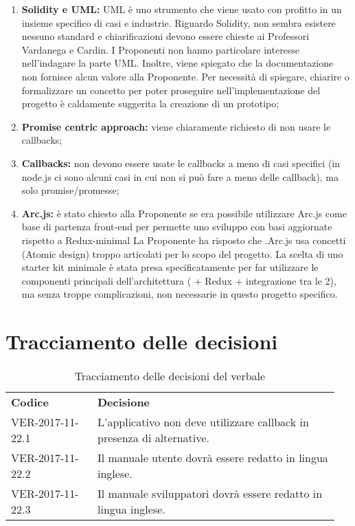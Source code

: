 \documentclass[VER-2017-11-22.tex]{subfiles}
\begin{document}
\begin{enumerate}
	\item \textbf{Solidity e UML:} UML è uno strumento che viene usato con profitto in un insieme specifico di casi e industrie. Riguardo Solidity, non sembra esistere nessuno standard e chiarificazioni devono essere chieste ai Professori Vardanega e Cardin. I Proponenti non hanno particolare interesse nell'indagare la parte UML. Inoltre, viene spiegato che la documentazione non fornisce alcun valore alla Proponente. Per necessità di spiegare, chiarire o formalizzare un concetto per poter proseguire nell'implementazione del progetto è caldamente suggerita la creazione di un prototipo;
	
	\item \textbf{Promise centric approach:} viene chiaramente richiesto di non usare le callbacks;
	
	\item \textbf{Callbacks:} non devono essere usate le callbacks a meno di casi specifici (in node.js ci sono alcuni casi in cui non si può fare a meno delle callback), ma solo promise/promesse;
	
	\item \textbf{Arc.js:} è stato chiesto alla Proponente se era possibile utilizzare Arc.js come base di partenza front-end per permette uno sviluppo con basi aggiornate rispetto a Redux-minimal La Proponente ha risposto che .Arc.js usa concetti (Atomic design) troppo articolati per lo scopo del progetto. La scelta di uno starter kit minimale è stata presa specificatamente per far utilizzare le  componenti principali dell'architettura  ( + Redux + integrazione tra le 2), ma senza troppe complicazioni, non necessarie in questo progetto specifico.
\end{enumerate}
\section{Tracciamento delle decisioni}
\begin{table}[H]
	\begin{center}
		\begin{tabu} to 
			\tableHeaderStyle
			\textbf{Codice} & \textbf{Decisione} \\
			VER-2017-11-22.1 & L'applicativo non deve utilizzare callback in presenza di alternative. \\
			VER-2017-11-22.2 & Il manuale utente dovrà essere redatto in lingua inglese. \\
			VER-2017-11-22.3 & Il manuale sviluppatori dovrà essere redatto in lingua inglese. \\
		\end{tabu}
		\caption{Tracciamento delle decisioni del verbale}
	\end{center}
\end{table}
\end{document}
